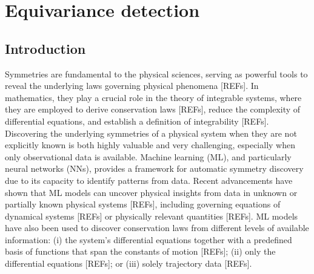 \chapter{Equivariance detection}
\nopagebreak
\label{chap:chapter_2}
\thispagestyle{empty}


\section{Introduction}\label{sec:intro}

Symmetries are fundamental to the physical sciences, serving as powerful tools to reveal the underlying laws governing physical phenomena [REFs]. In mathematics, they play a crucial role in the theory of integrable systems, where they are employed to derive conservation laws [REFs], reduce the complexity of differential equations, and establish a definition of integrability [REFs]. Discovering the underlying symmetries of a physical system when they are not explicitly known is both highly valuable and very challenging, especially when only observational data is available. Machine learning (ML), and particularly neural networks (NNs), provides a framework for automatic symmetry discovery due to its capacity to identify patterns from data. Recent advancements have shown that ML models can uncover physical insights from data in unknown or partially known physical systems [REFs], including governing equations of dynamical systems [REFs] or physically relevant quantities [REFs]. ML models have also been used to discover conservation laws from different levels of available information: (i) the system’s differential equations together with a predefined basis of functions that span the constants of motion [REFs]; (ii) only the differential equations [REFs]; or (iii) solely trajectory data [REFs].



